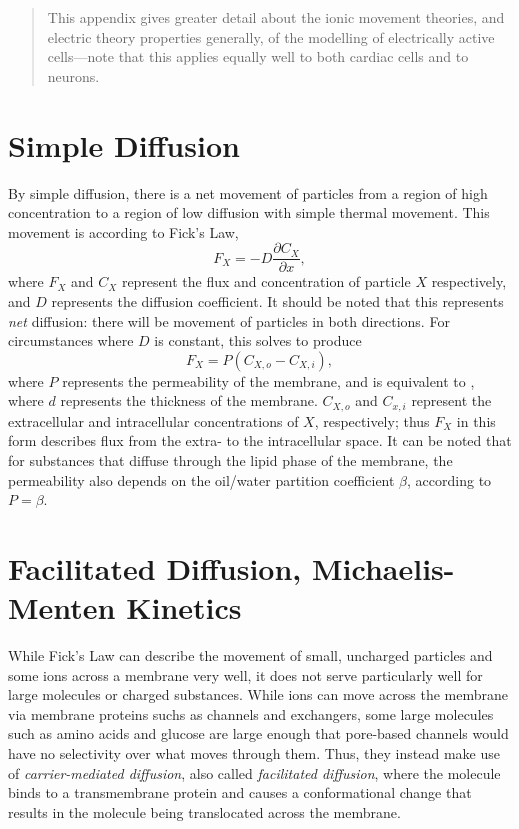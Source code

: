 \documentclass[../thesis-main.tex]{subfiles}
\begin{document}
 \begin{quote}
  This appendix gives greater detail about the ionic movement theories, and electric theory properties generally, of the modelling of electrically active cells---note that this applies equally well to both cardiac cells and to neurons.
 \end{quote}

 \section{Simple Diffusion}
 \label{sec:simple-diff}
 By simple diffusion, there is a net movement of particles from a region of high concentration to a region of low diffusion with simple thermal movement. This movement is according to Fick's Law,
 \begin{equation}
  F_X = -D\frac{\partial C_X}{\partial x},
 \end{equation}
 where $F_X$ and $C_X$ represent the flux and concentration of particle $X$ respectively, and $D$ represents the diffusion coefficient. It should be noted that this represents \emph{net} diffusion: there will be movement of particles in both directions. For circumstances where $D$ is constant, this solves to produce
 \begin{equation}
  F_X = P(C_{X,o}-C_{X,i}),
 \end{equation}
 where $P$ represents the permeability of the membrane, and is equivalent to , where $d$ represents the thickness of the membrane. $C_{X,o}$ and $C_{x,i}$ represent the extracellular and intracellular concentrations of $X$, respectively; thus $F_X$ in this form describes flux from the extra- to the intracellular space. It can be noted that for substances that diffuse through the lipid phase of the membrane, the permeability also depends on the oil/water partition coefficient $\beta$, according to $P = \beta$.
 
 \section{Facilitated Diffusion, Michaelis-Menten Kinetics}
 \label{sec:facil-diff}
 While Fick's Law can describe the movement of small, uncharged particles and some ions across a membrane very well, it does not serve particularly well for large molecules or charged substances. While ions can move across the membrane via membrane proteins suchs as channels and exchangers, some large molecules such as amino acids and glucose are large enough that pore-based channels would have no selectivity over what moves through them. Thus, they instead make use of \emph{carrier-mediated diffusion}, also called \emph{facilitated diffusion}, where the molecule binds to a transmembrane protein and causes a conformational change that results in the molecule being translocated across the membrane.
 
\end{document}
